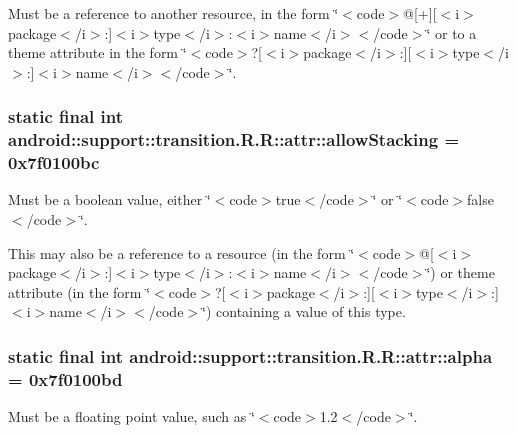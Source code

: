 Must be a reference to another resource, in the form \char`\"{}$<$code$>$@\mbox{[}+\mbox{]}\mbox{[}$<$i$>$package$<$/i$>$:\mbox{]}$<$i$>$type$<$/i$>$:$<$i$>$name$<$/i$>$$<$/code$>$\char`\"{} or to a theme attribute in the form \char`\"{}$<$code$>$?\mbox{[}$<$i$>$package$<$/i$>$:\mbox{]}\mbox{[}$<$i$>$type$<$/i$>$:\mbox{]}$<$i$>$name$<$/i$>$$<$/code$>$\char`\"{}. \hypertarget{classandroid_1_1support_1_1transition_1_1_r_1_1attr_c5b74a19ff76e9f008c44e6c312b6dc1}{
\subsubsection[{allowStacking}]{\setlength{\rightskip}{0pt plus 5cm}static final int android::support::transition.R.R::attr::allowStacking = 0x7f0100bc}}
\label{classandroid_1_1support_1_1transition_1_1_r_1_1attr_c5b74a19ff76e9f008c44e6c312b6dc1}


Must be a boolean value, either \char`\"{}$<$code$>$true$<$/code$>$\char`\"{} or \char`\"{}$<$code$>$false$<$/code$>$\char`\"{}. 

This may also be a reference to a resource (in the form \char`\"{}$<$code$>$@\mbox{[}$<$i$>$package$<$/i$>$:\mbox{]}$<$i$>$type$<$/i$>$:$<$i$>$name$<$/i$>$$<$/code$>$\char`\"{}) or theme attribute (in the form \char`\"{}$<$code$>$?\mbox{[}$<$i$>$package$<$/i$>$:\mbox{]}\mbox{[}$<$i$>$type$<$/i$>$:\mbox{]}$<$i$>$name$<$/i$>$$<$/code$>$\char`\"{}) containing a value of this type. \hypertarget{classandroid_1_1support_1_1transition_1_1_r_1_1attr_ef0c14b8294638efcedc2a756e6d7dd1}{
\subsubsection[{alpha}]{\setlength{\rightskip}{0pt plus 5cm}static final int android::support::transition.R.R::attr::alpha = 0x7f0100bd}}
\label{classandroid_1_1support_1_1transition_1_1_r_1_1attr_ef0c14b8294638efcedc2a756e6d7dd1}


Must be a floating point value, such as \char`\"{}$<$code$>$1.2$<$/code$>$\char`\"{}. 

